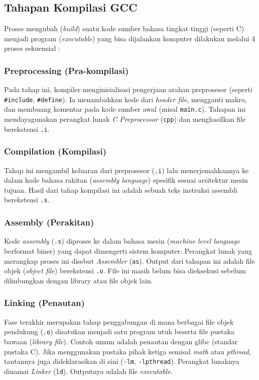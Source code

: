 \subsection{Tahapan Kompilasi GCC}
Proses mengubah (\textit{build}) suatu kode sumber bahasa tingkat tinggi (seperti C) menjadi program (\textit{executable}) yang bisa dijalankan komputer dilakukan melalui 4 proses sekuensial \cite{bryant2015computer}:

\subsubsection{Preprocessing (Pra-kompilasi)}
Pada tahap ini, kompiler menginisialisasi pengerjaan arahan preprosesor (seperti \texttt{\#include}, \texttt{\#define}). Ia menambahkan kode dari \textit{header file}, mengganti makro, dan membuang komentar pada kode sumber awal (misal \texttt{main.c}). Tahapan ini mendayagunakan perangkat lunak \textit{C Preprocessor} (\texttt{cpp}) dan menghasilkan file berekstensi \texttt{.i}.

\subsubsection{Compilation (Kompilasi)}
Tahap ini mengambil keluaran dari preprosesor (\texttt{.i}) lalu menerjemahkannya ke dalam kode bahasa rakitan (\textit{assembly language}) spesifik sesuai arsitektur mesin tujuan. Hasil dari tahap kompilasi ini adalah sebuah teks instruksi assembli berekstensi \texttt{.s}.

\subsubsection{Assembly (Perakitan)}
Kode \textit{assembly} (\texttt{.s}) diproses ke dalam bahasa mesin (\textit{machine level language} berformat biner) yang dapat dimengerti sistem komputer. Perangkat lunak yang merangkap proses ini disebut \textit{Assembler} (\texttt{as}). Output dari tahapan ini adalah file objek (\textit{object file}) berekstensi \texttt{.o}. File ini masih belum bisa dieksekusi sebelum dihubungkan dengan library atau file objek lain.

\subsubsection{Linking (Penautan)}
Fase terakhir merupakan tahap penggabungan di mana berbagai file objek pendukung (\texttt{.o}) disatukan menjadi satu program utuh beserta file pustaka bawaan (\textit{library file}). Contoh umum adalah penautan dengan glibc (standar pustaka C). Jika menggunakan pustaka pihak ketiga semisal \textit{math} atau \textit{pthread}, tautannya juga dideklarasikan di sini (\texttt{-lm}, \texttt{-lpthread}). Perangkat lunaknya dinamai \textit{Linker} (\texttt{ld}). Outputnya adalah file \textit{executable}.

